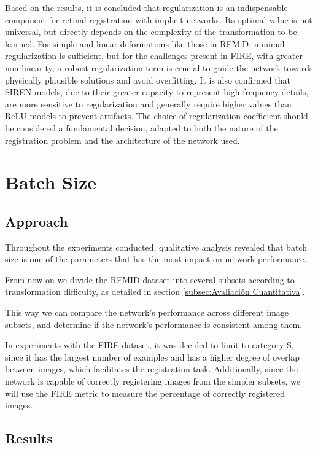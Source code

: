 Based on the results, it is concluded that regularization is an indispensable component for retinal registration with implicit networks. Its optimal value is not universal, but directly depends on the complexity of the transformation to be learned. For simple and linear deformations like those in RFMiD, minimal regularization is sufficient, but for the challenges present in FIRE, with greater non-linearity, a robust regularization term is crucial to guide the network towards physically plausible solutions and avoid overfitting. It is also confirmed that SIREN models, due to their greater capacity to represent high-frequency details, are more sensitive to regularization and generally require higher values than ReLU models to prevent artifacts. The choice of regularization coefficient should be considered a fundamental decision, adapted to both the nature of the registration problem and the architecture of the network used.

\section{Batch Size}
\label{sec:Tamaño de lote}

\subsection{Approach}
\label{subsec:Planteamento-batchsize}

Throughout the experiments conducted, qualitative analysis revealed that batch size is one of the parameters that has the most impact on network performance.

From now on we divide the RFMID dataset into several subsets according to transformation difficulty, as detailed in section \ref{subsec:Avaliación Cuantitativa}.

This way we can compare the network's performance across different image subsets, and determine if the network's performance is consistent among them.

In experiments with the FIRE dataset, it was decided to limit to category S, since it has the largest number of examples and has a higher degree of overlap between images, which facilitates the registration task.
Additionally, since the network is capable of correctly registering images from the simpler subsets, we will use the FIRE metric to measure the percentage of correctly registered images.

\subsection{Results}
\label{subsec:Resultados-batchsize}

